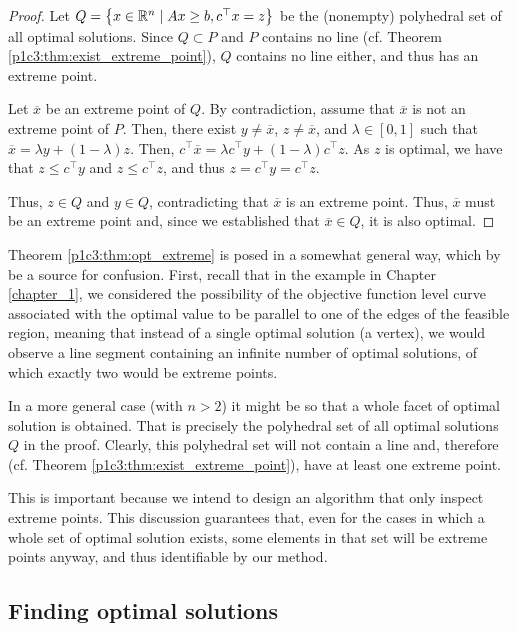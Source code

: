 \begin{proof}
	Let $Q = \left\{ x \in \mathbb{R}^n \mid Ax \geq b, c^\top x = z \right \}$ be the (nonempty) polyhedral set of all optimal solutions. Since $Q \subset P$ and $P$ contains no line (cf. Theorem \ref{p1c3:thm:exist_extreme_point}), $Q$ contains no line either, and thus has an extreme point.

	Let $\overline{x}$ be an extreme point of $Q$. By contradiction, assume that $\overline{x}$ is not an extreme point of $P$. Then, there exist $y \neq \overline{x}$, $z \neq \overline{x}$, and $\lambda \in [0,1]$ such that $\overline{x} = \lambda y + (1-\lambda)z$. Then, $c^\top \overline{x} = \lambda c^\top y + (1-\lambda)c^\top z$. As $z$ is optimal, we have that $z \leq c^\top y$ and $z \leq c^\top z$,  and thus $z = c^\top y = c^\top z$. 
	
	Thus, $z \in Q$ and $y \in Q$, contradicting that $\overline{x}$ is an extreme point. Thus, $\overline{x}$ must be an extreme point and, since we established that $\overline{x} \in Q$, it is also optimal. 
\end{proof}

Theorem \ref{p1c3:thm:opt_extreme} is posed in a somewhat general way, which by be a source for confusion. First, recall that in the example in Chapter \ref{chapter_1}, we considered the possibility of the objective function level curve associated with the optimal value to be parallel to one of the edges of the feasible region, meaning that instead of a single optimal solution (a vertex), we would observe a line segment containing an infinite number of optimal solutions, of which exactly two would be extreme points. 

In a more general case (with $n > 2$) it might be so that a whole facet of optimal solution is obtained. That is precisely the polyhedral set of all optimal solutions $Q$ in the proof. Clearly, this polyhedral set will not contain a line and, therefore (cf. Theorem \ref{p1c3:thm:exist_extreme_point}), have at least one extreme point. 

This is important because we intend to design an algorithm that only inspect extreme points. This discussion guarantees that, even for the cases in which a whole set of optimal solution exists, some elements in that set will be extreme points anyway, and thus identifiable by our method.


\subsection{Finding optimal solutions}

